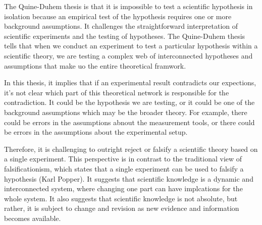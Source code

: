 \documentclass[UTF8,a4paper,AutoFakeBold,AutoFakeSlant]{article}
\begin{document}
The Quine-Duhem thesis is that it is impossible to test a scientific hypothesis in isolation because an empirical 
test of the hypothesis requires one or more background assumptions.
It challenges the straightforward interpretation of scientific experiments and the testing of hypotheses.
The Quine-Duhem thesis tells that when we conduct an experiment to test a particular hypothesis within a scientific theory,
we are testing a complex web of interconnected hypotheses and assumptions that make uo the entire theoretical framwork.

In this thesis, it implies that if an experimental result contradicts our expections, it's not clear which part of this 
theoretical network is responsible for the contradiction. It could be the hypothesis we are testing, or it could be one of the
background assumptions which may be the broader theory. For example, there could be errors in the assumptions abnout the 
measurement tools, or there could be errors in the assumptions about the experimental setup.

Therefore, it is challenging to outright reject or falsify a scientific theory based on a single experiment.
This perspective is in contrast to the traditional view of
falsificationism, which states that a single experiment can be used to falsify a hypothesis (Karl Popper).
It suggests that scientific knowledge is a dynamic and interconnected system, where changing one part can have 
implcations for the whole system. It also suggests that scientific knowledge is not absolute, but rather, it is
subject to change and revision as new evidence and information becomes available.






% 
% 
% 
\end{document}
